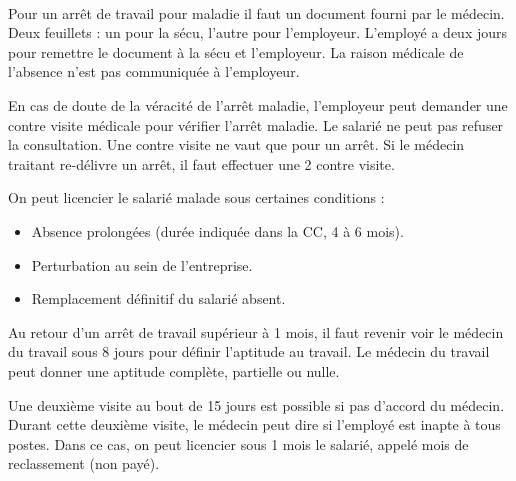 \paragraph{}
Pour un arrêt de travail pour maladie il faut un document fourni par le médecin.
Deux feuillets : un pour la sécu, l’autre pour l’employeur.
L’employé a deux jours pour remettre le document à la sécu et l’employeur.
La raison médicale de l’absence n’est pas communiquée à l’employeur.

En cas de doute de la véracité de l’arrêt maladie, l’employeur peut demander une contre visite médicale pour vérifier l’arrêt maladie.
Le salarié ne peut pas refuser la consultation.
Une contre visite ne vaut que pour un arrêt.
Si le médecin traitant re-délivre un arrêt, il faut effectuer une 2 contre visite.

On peut licencier le salarié malade sous certaines conditions :
\begin{itemize}
	\item[\textbullet] Absence prolongées (durée indiquée dans la CC, 4 à 6 mois).
	\item[\textbullet] Perturbation au sein de l’entreprise.
	\item[\textbullet] Remplacement définitif du salarié absent.
\end{itemize}

Au retour d’un arrêt de travail supérieur à 1 mois, il faut revenir voir le médecin du travail sous 8 jours pour définir l’aptitude au travail.
Le médecin du travail peut donner une aptitude complète, partielle ou nulle.

Une deuxième visite au bout de 15 jours est possible si pas d’accord du médecin.
Durant cette deuxième visite, le médecin peut dire si l’employé est inapte à tous postes.
Dans ce cas, on peut licencier sous 1 mois le salarié, appelé mois de reclassement (non payé).